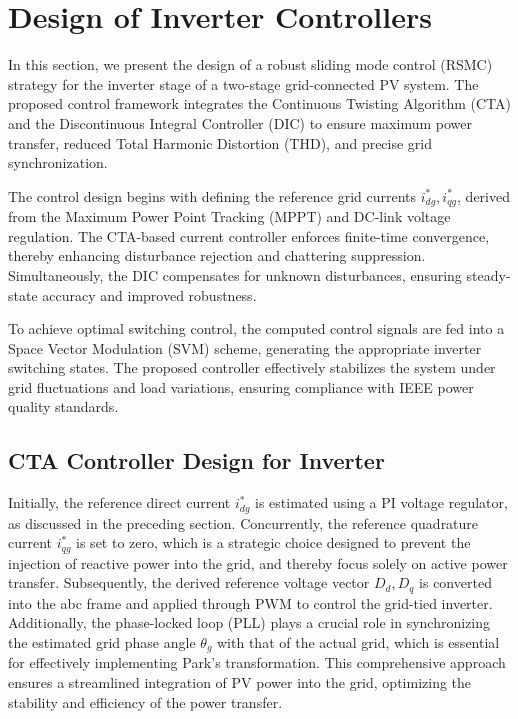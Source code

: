 \documentclass[preprint,12pt]{elsarticle}
\begin{document}
\section{Design of Inverter Controllers}
\label{sec:inverter-controllers}
In this section, we present the design of a robust sliding mode control (RSMC) strategy for the inverter stage of a two-stage grid-connected PV system. The proposed control framework integrates the Continuous Twisting Algorithm (CTA) and the Discontinuous Integral Controller (DIC) to ensure maximum power transfer, reduced Total Harmonic Distortion (THD), and precise grid synchronization.

The control design begins with defining the reference grid currents \(i^*_{dg}, i^*_{qg}\), derived from the Maximum Power Point Tracking (MPPT) and DC-link voltage regulation. The CTA-based current controller enforces finite-time convergence, thereby enhancing disturbance rejection and chattering suppression. Simultaneously, the DIC compensates for unknown disturbances, ensuring steady-state accuracy and improved robustness.

To achieve optimal switching control, the computed control signals are fed into a Space Vector Modulation (SVM) scheme, generating the appropriate inverter switching states. The proposed controller effectively stabilizes the system under grid fluctuations and load variations, ensuring compliance with IEEE power quality standards.

\subsection{CTA Controller Design for Inverter}
\label{subsec:cta-inverter}
Initially, the reference direct current \(i^*_{dg}\) is estimated using a PI voltage regulator, as discussed in the preceding section. Concurrently, the reference quadrature current \(i^*_{qg}\) is set to zero, which is a strategic choice designed to prevent the injection of reactive power into the grid, and thereby focus solely on active power transfer. Subsequently, the derived reference voltage vector \(D_d, D_q\) is converted into the abc frame and applied through PWM to control the grid-tied inverter. Additionally, the phase-locked loop (PLL) plays a crucial role in synchronizing the estimated grid phase angle $\theta_g$  with that of the actual grid, which is essential for effectively implementing Park’s transformation. This comprehensive approach ensures a streamlined integration of PV power into the grid, optimizing the stability and efficiency of the power transfer.
\end{document}
